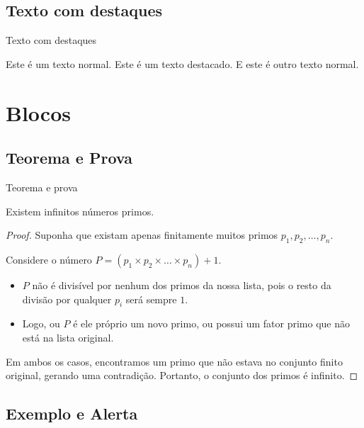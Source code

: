 \documentclass[aspectratio=169]{beamer}
\begin{document}
\subsection{Texto com destaques}

\begin{frame}{Texto com destaques}
    
Este é um texto normal. \alert{Este é um texto destacado.} E este é outro texto normal.
\end{frame}

\section{Blocos}

\subsection{Teorema e Prova}

\begin{frame}{Teorema e prova}

\begin{theorem}
    Existem infinitos números primos.
  \end{theorem}

  \begin{proof}
    Suponha que existam apenas finitamente muitos primos $p_1, p_2, \dots, p_n$. 
    
    Considere o número $P = (p_1 \times p_2 \times \dots \times p_n) + 1$.
    
    \begin{itemize}
        \item $P$ não é divisível por nenhum dos primos da nossa lista, pois o resto da divisão por qualquer $p_i$ será sempre $1$.
        \item Logo, ou $P$ é ele próprio um novo primo, ou possui um fator primo que não está na lista original.
    \end{itemize}
    
    Em ambos os casos, encontramos um primo que não estava no conjunto finito original, gerando uma contradição. Portanto, o conjunto dos primos é infinito.
  \end{proof}

\end{frame}

\subsection{Exemplo e Alerta}
\end{document}
